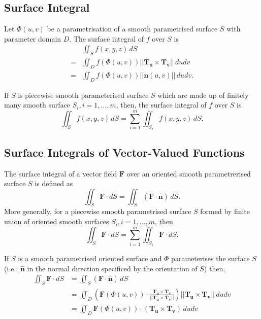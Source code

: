 \subsection{Surface Integral}
Let \(\Phi(u,v)\) be a parametrisation of a smooth parametrised surface \(S\) with parameter domain \(D\). The surface integral of \(f\) over \(S\) is
\begin{align*}
    & \iint_S f(x,y,z) \, dS \\
    = & \iint_D f(\Phi(u,v))||\textbf{T}_{\textbf{u}} \times \textbf{T}_\textbf{v} || \, dudv \\
    = & \iint_D f(\Phi(u,v))||\textbf{n}(u,v)|| \, dudv.
\end{align*}

If \(S\) is piecewise smooth parameterised surface \(S\) which are made up of finitely many smooth surface \(S_i, i = 1,\dots,m\), then, the surface integral of \(f\) over \(S\) is 
\[\iint_S f(x,y,z) \, dS = \sum_{i=1}^m \iint_{S_i} f(x,y,z) \, dS.\]

\subsection{Surface Integrals of Vector-Valued Functions}
The surface integral of a vector field \(\textbf{F}\) over an oriented smooth parametrerised surface \(S\) is defined as 
\[\iint_S \textbf{F} \cdot dS = \iint_S (\textbf{F} \cdot \hat{\textbf{n}}) \, dS.\]
More generally, for a piecewise smooth parametrised surface \(S\) formed by finite union of oriented smooth surfaces \(S_i, i = 1,\dots, m\), then
\[\iint_S \textbf{F} \cdot dS = \sum_{i=1}^m \iint_{S_i} \textbf{F} \cdot dS.\]

If \(S\) is a smooth parametrised oriented surface and \(\Phi\) parameterises the surface \(S\) (i.e., \(\hat{\textbf{n}}\) in the normal direction specificed by the orientation of \(S\)) then,
\begin{align*}
    \iint_S \textbf{F} \cdot dS & = \iint_S (\textbf{F} \cdot \hat{\textbf{n}}) \, dS \\
    & = \iint_D \left(\textbf{F}(\Phi(u,v)) \cdot \frac{\textbf{T}_\textbf{u} \times \textbf{T}_\textbf{v}}{||\textbf{T}_\textbf{u} \times \textbf{T}_\textbf{v}||} \right) ||\textbf{T}_\textbf{u} \times \textbf{T}_\textbf{v}|| \, dudv \\
    & = \iint_D \textbf{F}(\Phi(u,v)) \cdot (\textbf{T}_\textbf{u} \times \textbf{T}_\textbf{v}) \, dudv
\end{align*}